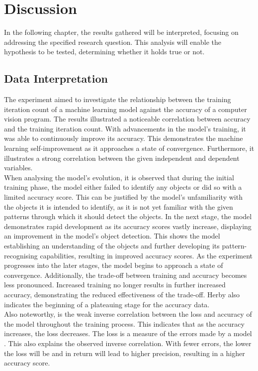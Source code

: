 \section{Discussion}
In the following chapter, the results gathered will be interpreted, focusing on addressing the specified research question. This analysis will enable the hypothesis to be tested, determining whether it holds true or not.\\


\subsection{Data Interpretation}

The experiment aimed to investigate the relationship between the training iteration count of a machine learning model against the accuracy of a computer vision program. The results illustrated a noticeable correlation between accuracy and the training iteration count. With advancements in the model's training, it was able to continuously improve its accuracy. This demonstrates the machine learning self-improvement as it approaches a state of convergence. Furthermore, it illustrates a strong correlation between the given independent and dependent variables.  \\

When analysing the model's evolution, it is observed that during the initial training phase, the model either failed to identify any objects or did so with a limited accuracy score. This can be justified by the model's unfamiliarity with the objects it is intended to identify, as it is not yet familiar with the given patterns through which it should detect the objects. In the next stage, the model demonstrates rapid development as its accuracy scores vastly increase, displaying an improvement in the model's object detection. This shows the model establishing an understanding of the objects and further developing its pattern-recognising capabilities, resulting in improved accuracy scores. As the experiment progresses into the later stages, the model begins to approach a state of convergence. Additionally, the trade-off between training and accuracy becomes less pronounced. Increased training no longer results in further increased accuracy, demonstrating the reduced effectiveness of the trade-off. Herby also indicates the beginning of a plateauing stage for the accuracy data.   \\ 

Also noteworthy, is the weak inverse correlation between the loss and accuracy of the model throughout the training process. This indicates that as the accuracy increases, the loss decreases. The loss is a measure of the errors made by a model \parencite{Baeldung2022}. This also explains the observed inverse correlation. With fewer errors, the lower the loss will be and in return will lead to higher precision, resulting in a higher accuracy score. \\

